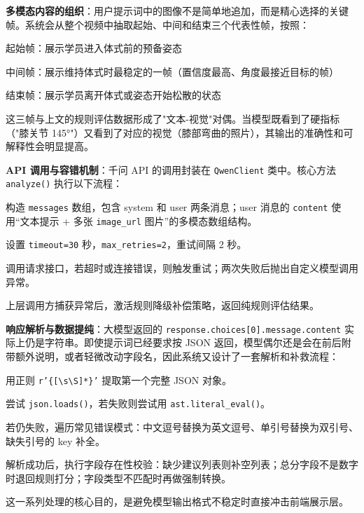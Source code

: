 \textbf{多模态内容的组织}：用户提示词中的图像不是简单地追加，而是精心选择的关键帧。系统会从整个视频中抽取起始、中间和结束三个代表性帧，按照：

\begin{chineseenum}
  \item 起始帧：展示学员进入体式前的预备姿态
  \item 中间帧：展示维持体式时最稳定的一帧（置信度最高、角度最接近目标的帧）
  \item 结束帧：展示学员离开体式或姿态开始松散的状态
\end{chineseenum}

这三帧与上文的规则评估数据形成了"文本-视觉"对偶。当模型既看到了硬指标（"膝关节 145°"）又看到了对应的视觉（膝部弯曲的照片），其输出的准确性和可解释性会明显提高。

\textbf{API 调用与容错机制}：千问 API 的调用封装在 \texttt{QwenClient} 类中。核心方法 \texttt{analyze()} 执行以下流程：
\begin{chineseenum}
  \item 构造 \texttt{messages} 数组，包含 system 和 user 两条消息；user 消息的 \texttt{content} 使用“文本提示 + 多张 \texttt{image\_url} 图片”的多模态数组结构。
  \item 设置 \texttt{timeout=30} 秒，\texttt{max\_retries=2}，重试间隔 2 秒。
  \item 调用请求接口，若超时或连接错误，则触发重试；两次失败后抛出自定义模型调用异常。
  \item 上层调用方捕获异常后，激活规则降级补偿策略，返回纯规则评估结果。
\end{chineseenum}

\textbf{响应解析与数据提纯}：大模型返回的 \texttt{response.choices[0].message.content} 实际上仍是字符串。即使提示词已经要求按 JSON 返回，模型偶尔还是会在前后附带额外说明，或者轻微改动字段名，因此系统又设计了一套解析和补救流程：
\begin{chineseenum}
  \item 用正则 \texttt{r'\{[\textbackslash s\textbackslash S]*\}'} 提取第一个完整 JSON 对象。
  \item 尝试 \texttt{json.loads()}，若失败则尝试用 \texttt{ast.literal\_eval()}。
  \item 若仍失败，遍历常见错误模式：中文逗号替换为英文逗号、单引号替换为双引号、缺失引号的 key 补全。
  \item 解析成功后，执行字段存在性校验：缺少建议列表则补空列表；总分字段不是数字时退回规则打分；字段类型不匹配时再做强制转换。
\end{chineseenum}
这一系列处理的核心目的，是避免模型输出格式不稳定时直接冲击前端展示层。

